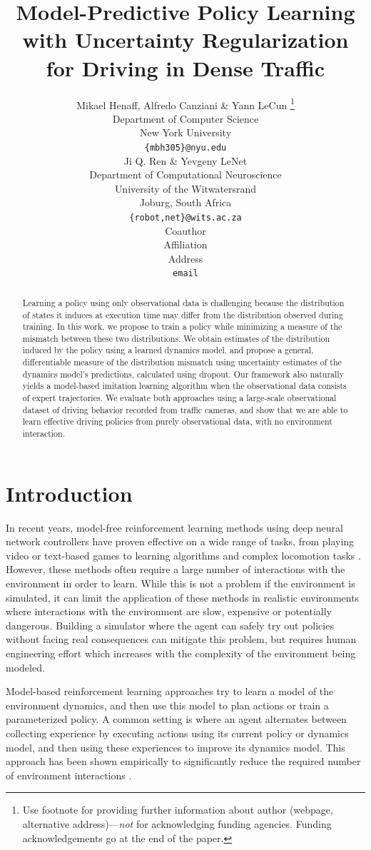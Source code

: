 \documentclass{article} %
\title{Model-Predictive Policy Learning with Uncertainty Regularization for Driving in Dense Traffic}
\author{Mikael Henaff, Alfredo Canziani \& Yann LeCun \thanks{ Use footnote for providing further information
about author (webpage, alternative address)---\emph{not} for acknowledging
funding agencies.  Funding acknowledgements go at the end of the paper.} \\
Department of Computer Science\\
New York University\\
\texttt{\{mbh305\}@nyu.edu} \\
\And
Ji Q. Ren \& Yevgeny LeNet \\
Department of Computational Neuroscience \\
University of the Witwatersrand \\
Joburg, South Africa \\
\texttt{\{robot,net\}@wits.ac.za} \\
\AND
Coauthor \\
Affiliation \\
Address \\
\texttt{email}
}
\begin{document}
\newcommand{\modelnamedrop}{MPUR}
\newcommand{\modelnameil}{MPIL}

\maketitle

\begin{abstract}
  Learning a policy using only observational data is challenging because the distribution of states it induces at execution time may differ from the distribution observed during training.
  In this work, we propose to train a policy while minimizing a measure of the mismatch between these two distributions.
  We obtain estimates of the distribution induced by the policy using a learned dynamics model, and propose a general, differentiable measure of the distribution mismatch using uncertainty estimates of the dynamics model's predictions, calculated using dropout. Our framework also naturally yields a model-based imitation learning algorithm when the observational data consists of expert trajectories.
  We evaluate both approaches using a large-scale observational dataset of driving behavior recorded from traffic cameras, and show that we are able to learn effective driving policies from purely observational data, with no environment interaction. 
\end{abstract}


\section{Introduction}

In recent years, model-free reinforcement learning methods using deep neural network controllers have proven effective on a wide range of tasks, from playing video or text-based games \citep{mnih15, A3C, NarasimhanKB15} to learning algorithms \citep{Zaremba15} and complex locomotion tasks \citep{Lillicrap2015, ZhangLMUC15}.
However, these methods often require a large number of interactions with the environment in order to learn.
While this is not a problem if the environment is simulated, it can limit the application of these methods in realistic environments where interactions with the environment are slow, expensive or potentially dangerous.
Building a simulator where the agent can safely try out policies without facing real consequences can mitigate this problem, but requires human engineering effort which increases with the complexity of the environment being modeled.


Model-based reinforcement learning approaches try to learn a model of the environment dynamics, and then use this model to plan actions or train a parameterized policy.
A common setting is where an agent alternates between collecting experience by executing actions using its current policy or dynamics model, and then using these experiences to improve its dynamics model.
This approach has been shown empirically to significantly reduce the required number of environment interactions \citep{Atkeson1997, PILCO, Nagabandi2017, Chua2018}.
\end{document}
